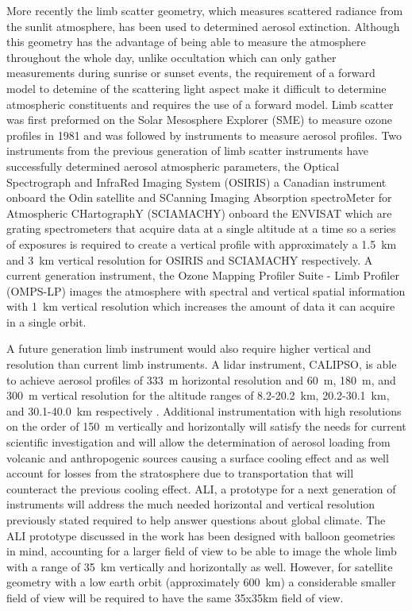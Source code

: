 \documentclass[12pt]{article}
\begin{document}
More recently the limb scatter geometry, which measures scattered radiance from the sunlit atmosphere, has been used to determined aerosol extinction. Although this geometry has the advantage of being able to measure the atmosphere throughout the whole day, unlike occultation which can only gather measurements during sunrise or sunset events, the requirement of a forward model to detemine  of the scattering light aspect make it difficult to determine atmospheric constituents and requires the use of a forward model. Limb scatter was first preformed on the Solar Mesosphere Explorer (SME) \citep{Barth1983} to measure ozone profiles in 1981 and was followed by instruments to measure aerosol profiles. Two instruments from the previous generation of limb scatter instruments have successfully determined aerosol atmospheric parameters, the Optical Spectrograph and InfraRed Imaging System (OSIRIS) a Canadian instrument onboard the Odin satellite \citep{Llewellyn2004} and SCanning Imaging Absorption spectroMeter for Atmospheric CHartographY (SCIAMACHY) onboard the ENVISAT \citep{Bovensmann1999} which are grating spectrometers that acquire data at a single altitude at a time so a series of exposures is required to create a vertical profile with approximately a 1.5~km and 3~km vertical resolution for OSIRIS and SCIAMACHY respectively. A current generation instrument, the Ozone Mapping Profiler Suite - Limb Profiler (OMPS-LP) \citep{Rault2013} images the atmosphere with spectral and vertical spatial information with 1~km vertical resolution which increases the amount of data it can acquire in a single orbit.

A future generation limb instrument would also require higher vertical and resolution than current limb instruments. A lidar instrument, CALIPSO, is able to achieve aerosol profiles of 333~m horizontal resolution and 60~m, 180~m, and 300~m vertical resolution for the altitude ranges of 8.2-20.2~km, 20.2-30.1~km, and 30.1-40.0~km respectively \citep{Winker2003}. Additional instrumentation with high resolutions on the order of 150~m vertically and horizontally will satisfy the needs for current scientific investigation and will allow the determination of aerosol loading from volcanic and anthropogenic sources causing a surface cooling effect and as well account for losses from the stratosphere due to transportation that will counteract the previous cooling effect. ALI, a prototype for a next generation of instruments will address the much needed horizontal and vertical resolution previously stated required to help answer questions about global climate. The ALI prototype discussed in the work has been designed with balloon geometries in mind, accounting for a larger field of view to be able to image the whole limb with a range of 35~km vertically and horizontally as well. However, for satellite geometry with a low earth orbit (approximately 600~km) a considerable smaller field of view will be required to have the same 35x35km field of view.
\end{document}
